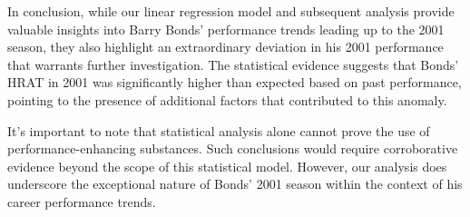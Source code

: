 \documentclass[
]{article}
\begin{document}
In conclusion, while our linear regression model and subsequent analysis
provide valuable insights into Barry Bonds' performance trends leading
up to the 2001 season, they also highlight an extraordinary deviation in
his 2001 performance that warrants further investigation. The
statistical evidence suggests that Bonds' HRAT in 2001 was significantly
higher than expected based on past performance, pointing to the presence
of additional factors that contributed to this anomaly.

It's important to note that statistical analysis alone cannot prove the
use of performance-enhancing substances. Such conclusions would require
corroborative evidence beyond the scope of this statistical model.
However, our analysis does underscore the exceptional nature of Bonds'
2001 season within the context of his career performance trends.
\end{document}
